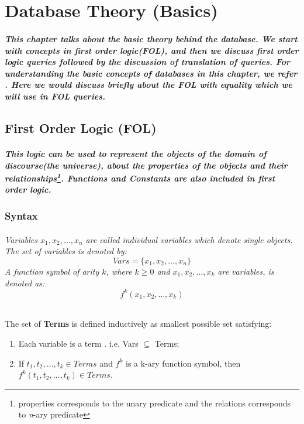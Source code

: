 \chapter{Database Theory (Basics)}
\label{ch:db_basic}
\paragraph*{\textnormal{This chapter talks about the basic theory behind the database. We start with concepts in first order logic(FOL), and then we discuss first order logic queries followed by the discussion of translation of queries. For understanding the basic concepts of databases in this chapter, we refer \cite{DBLP:books/aw/found_DB}.  Here we would discuss briefly about the FOL with equality which we will use in FOL queries.}}

\section{First Order Logic (FOL)}
\label{sec:db_theory_FOL}
\paragraph*{\textnormal{This logic can be used to represent the objects of the domain of discourse(the universe), about the properties of the objects and their relationships\footnote{properties corresponds to the unary predicate and the relations corresponds to \textit{n}-ary predicate}. Functions and Constants are also included in first order logic.}}

\subsection*{Syntax}
\subparagraph*{\textnormal{Variables $x_{1},x_{2},\ldots,x_{n}$ are called individual variables which denote single objects. The set of variables is denoted by:
\begin{equation*}
Vars = \{x_{1},x_{2},\ldots,x_{n}\}
\end{equation*}
A function symbol of arity $k$, where $k \geq 0$ and $x_{1},x_{2},\ldots,x_{k}$ are variables, is denoted as:
\begin{equation*}
f^{k}(x_{1},x_{2},\ldots,x_{k})
\end{equation*}
}}

\begin{defs}
The set of \textbf{Terms} is defined inductively as smallest possible set satisfying:
\begin{enumerate}
\item Each variable is a term . i.e. Vars $\subseteq$ Terms;
\item If $t_{1},t_{2},\ldots,t_{k} \in Terms$ and $f^{k}$ is a k-ary function symbol, then $f^k(t_{1},t_{2},\ldots,t_{k}) \in Terms$.
\end{enumerate}	 
\end{defs}

